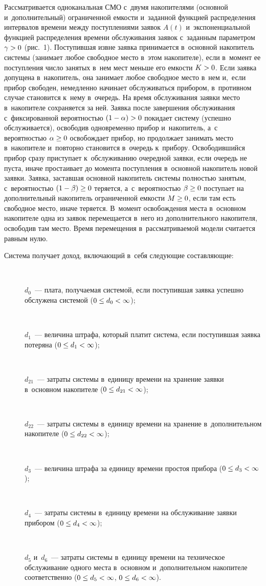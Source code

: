 \begin{multicols}{2}
  Рассматривается одноканальная СМО с~двумя накопителями (основной 
и~дополнительный) ограниченной емкости и~заданной функцией 
распределения интервалов времени между поступлениями заявок $A(t)$ 
и~экспоненциальной функцией распределения времени обслуживания заявок 
с~заданным параметром $\gamma\hm>0$ (рис.~1). Поступившая извне 
заявка принимается в~основ\-ной накопитель сис\-те\-мы (занимает любое 
свободное место в~этом накопителе), если в~момент ее поступления чис\-ло 
занятых в~нем мест меньше его емкости $K\hm>0$. Если заявка допущена 
в~накопитель, она занимает любое свободное место в~нем и,~если прибор 
свободен, немедленно начинает обслуживаться прибором, в~противном случае 
становится к~нему в~очередь. На время обслуживания заявки место 
в~накопителе сохраняется за ней. Заявка после завершения обслуживания 
с~фиксированной вероятностью $(1\hm-\alpha)\hm>0$ покидает систему 
(успешно обслуживается), освободив одновременно прибор и~накопитель, а~с 
вероятностью $\alpha\hm\geq0$ освобождает прибор, но продолжает занимать 
место в~накопителе и~повторно становится в~очередь к~прибору. 
Освободившийся прибор сразу приступает к~обслуживанию очередной заявки, 
если очередь не пус\-та, иначе простаивает до момента поступления 
в~основной накопитель новой заявки. Заявка, заставшая основной накопитель 
сис\-те\-мы пол\-ностью занятым, с~вероятностью $(1\hm-\beta)\hm\geq0$ теряется, 
а~с~вероятностью $\beta\hm\geq0$ поступает на дополнительный накопитель 
ограниченной емкости $M\hm\geq0$, если там есть свободное место, иначе 
теряется. В~момент освобождения места в~основном накопителе одна из 
заявок перемещается в~него из дополнительного накопителя, освободив там 
место. Время перемещения в~рассматриваемой модели считается равным нулю. 
  
  
  Система получает доход, включающий в~себя следующие составляющие:
  \begin{description}
  \item[\,]
  $d_0$~--- плата, получаемая системой, если поступившая заявка успешно 
обслужена системой ($0\hm\leq d_0\hm<\infty$); 
  \item[\,]
  $d_1$~--- величина штрафа, который платит система, если поступившая 
заявка потеряна ($0\hm\leq d_1\hm<\infty$);
  \item[\,]
  $d_{21}$~--- затраты системы в~единицу времени на хранение заявки 
в~основном накопителе ($0\hm\leq d_{21}\hm<\infty$);
  \item[\,]
  $d_{22}$~--- затраты системы в~единицу времени на хранение 
в~дополнительном накопителе ($0\hm\leq d_{22}\hm<\infty$);
  \item[\,]
  $d_3$~--- величина штрафа за единицу времени простоя прибора ($0\hm\leq 
d_3\hm<\infty$);
  \item[\,]
  $d_4$~--- затраты системы в~единицу времени на обслуживание заявки 
прибором ($0\hm\leq d_4\hm<\infty$);
  \item[\,]
  $d_5$ и~$d_6$~--- затраты системы в~единицу времени на техническое 
обслуживание одного мес\-та в~основном и~дополнительном накопителе 
соответственно ($0\hm\leq d_5\hm<\infty$, $0\hm\leq d_6\hm<\infty$).
  \end{description}
  

\end{multicols}
